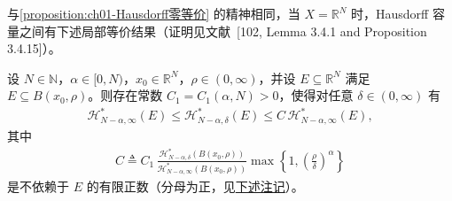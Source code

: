 \documentclass[../../main.tex]{subfiles}%
\begin{document}
与\cref{proposition:ch01-Hausdorff零等价} 的精神相同，当 $X=\mathbb{R}^N$ 时，Hausdorff 容量之间有下述局部等价结果（证明见文献~[102, Lemma 3.4.1 and Proposition 3.4.15]）。

\begin{proposition}\label{proposition:ch01-Hausdorff局部等价}
设 $N\in\mathbb{N}$，$\alpha\in[0,N)$，$x_0\in\mathbb{R}^N$，$\rho\in(0,\infty)$，并设 $E\subseteq\mathbb{R}^N$ 满足 $E\subseteq B(x_0,\rho)$。则存在常数 $C_1=C_1(\alpha,N)>0$，使得对任意 $\delta\in(0,\infty)$ 有
\begin{align}
\mathcal{H}_{N-\alpha,\infty}^*(E)\leqslant\mathcal{H}_{N-\alpha,\delta}^*(E)\leqslant C\,\mathcal{H}_{N-\alpha,\infty}^*(E), \label{align:ch01-Hausdorff局部等价}
\end{align}
其中
\begin{align*}
C\triangleq C_1\,\frac{\mathcal{H}_{N-\alpha,\delta}^*(B(x_0,\rho))}{\mathcal{H}_{N-\alpha,\infty}^*(B(x_0,\rho))}\max\left\{1,\left(\frac{\rho}{\delta}\right)^\alpha\right\}
\end{align*}
是不依赖于 $E$ 的有限正数（分母为正，见\hyperref[remark:ch01-Hausdorff局部等价]{下述注记}）。
\end{proposition}
\end{document}
